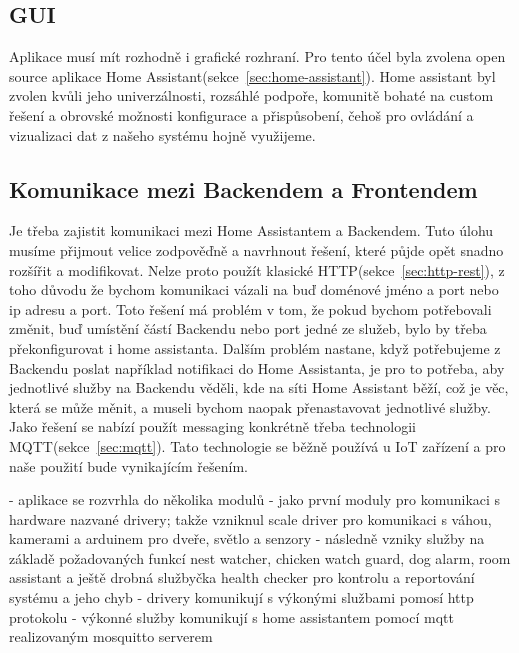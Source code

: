\subsection{GUI}\label{subsec:gui}
Aplikace musí mít rozhodně i grafické rozhraní.
Pro tento účel byla zvolena open source aplikace Home Assistant(sekce~\ref{sec:home-assistant}).
Home assistant byl zvolen kvůli jeho univerzálnosti, rozsáhlé podpoře, komunitě bohaté na custom řešení a obrovské možnosti konfigurace a přispůsobení, čehoš pro ovládání a vizualizaci dat z našeho systému hojně využijeme.

\subsection{Komunikace mezi Backendem a Frontendem}\label{subsec:komunikace-mezi-backendem-a-frontendem}
Je třeba zajistit komunikaci mezi Home Assistantem a Backendem.
Tuto úlohu musíme přijmout velice zodpověďně a navrhnout řešení, které půjde opět snadno rozšířit a modifikovat.
Nelze proto použít klasické HTTP(sekce~\ref{sec:http-rest}), z toho důvodu že bychom komunikaci vázali na buď doménové jméno a port nebo ip adresu a port.
Toto řešení má problém v tom, že pokud bychom potřebovali změnit, buď umístění částí Backendu nebo port jedné ze služeb, bylo by třeba překonfigurovat i home assistanta.
Dalším problém nastane, když potřebujeme z Backendu poslat například notifikaci do Home Assistanta, je pro to potřeba, aby jednotlivé služby na Backendu věděli, kde na síti Home Assistant běží, což je věc, která se může měnit, a museli bychom naopak přenastavovat jednotlivé služby.
Jako řešení se nabízí použít messaging konkrétně třeba technologii MQTT(sekce~\ref{sec:mqtt}).
Tato technologie se běžně používá u IoT zařízení a pro naše použití bude vynikajícím řešením.


- aplikace se rozvrhla do několika modulů\newline
- jako první moduly pro komunikaci s hardware nazvané drivery; takže vzniknul scale driver pro komunikaci s váhou, kamerami a arduinem pro dveře, světlo a senzory\newline
- následně vzniky služby na základě požadovaných funkcí nest watcher, chicken watch guard, dog alarm, room assistant a ještě drobná službyčka health checker pro kontrolu a reportování systému a jeho chyb\newline
- drivery komunikují s výkonými službami pomosí http protokolu \newline
- výkonné služby komunikují s home assistantem pomocí mqtt realizovaným mosquitto serverem

